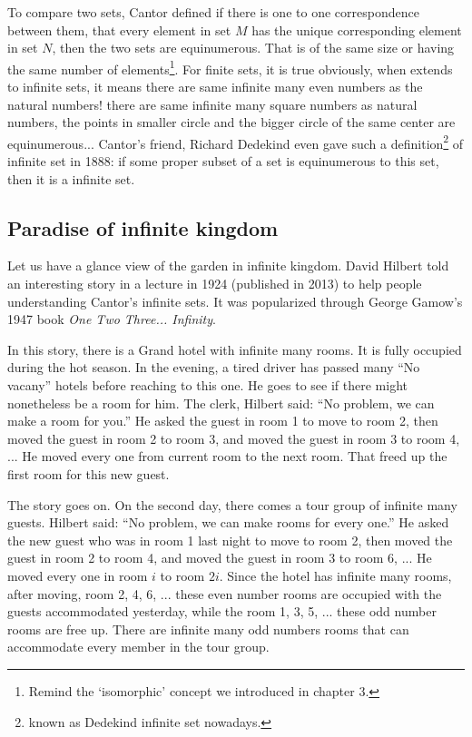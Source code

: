 \documentclass{article}
\begin{document}
To compare two sets, Cantor defined if there is one to one correspondence between them, that every element in set $M$ has the unique corresponding element in set $N$, then the two sets are equinumerous. That is of the same size or having the same number of elements\footnote{Remind the `isomorphic' concept we introduced in chapter 3.}. For finite sets, it is true obviously, when extends to infinite sets, it means there are same infinite many even numbers as the natural numbers! there are same infinite many square numbers as natural numbers, the points in smaller circle and the bigger circle of the same center are equinumerous... Cantor's friend, Richard Dedekind even gave such a definition\footnote{known as Dedekind infinite set nowadays.} of infinite set in 1888: if some proper subset of a set is equinumerous to this set, then it is a infinite set.


\subsection{Paradise of infinite kingdom}

Let us have a glance view of the garden in infinite kingdom. David Hilbert told an interesting story in a lecture in 1924 (published in 2013) to help people understanding Cantor's infinite sets. It was popularized through George Gamow's 1947 book {\em One Two Three... Infinity}.

In this story, there is a Grand hotel with infinite many rooms. It is fully occupied during the hot season. In the evening, a tired driver has passed many ``No vacany'' hotels before reaching to this one. He goes to see if there might nonetheless be a room for him. The clerk, Hilbert said: ``No problem, we can make a room for you.'' He asked the guest in room 1 to move to room 2, then moved the guest in room 2 to room 3, and moved the guest in room 3 to room 4, ... He moved every one from current room to the next room. That freed up the first room for this new guest.

The story goes on. On the second day, there comes a tour group of infinite many guests. Hilbert said: ``No problem, we can make rooms for every one.'' He asked the new guest who was in room 1 last night to move to room 2, then moved the guest in room 2 to room 4, and moved the guest in room 3 to room 6, ... He moved every one in room $i$ to room $2i$. Since the hotel has infinite many rooms, after moving, room 2, 4, 6, ... these even number rooms are occupied with the guests accommodated yesterday, while the room 1, 3, 5, ... these odd number rooms are free up. There are infinite many odd numbers rooms that can accommodate every member in the tour group.
\end{document}
